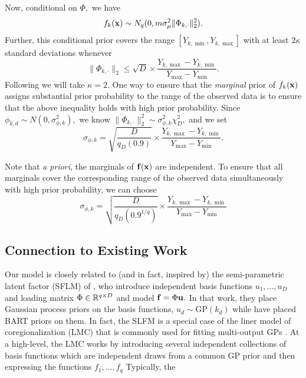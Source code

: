 \documentclass[12pt]{article}
\begin{document}
Now, conditional on $\Phi,$ we have 
$$
f_{k}(\mathbf{x}) \sim N_{q}(0, m\sigma^{2}_{\mu}\lVert \Phi_{k,\cdot}\rVert_{2}^{2}).
$$
Further, this conditional prior covers the range $[Y_{k,\min}, Y_{k,\max}]$ with at least $2\kappa$ standard deviations whenever
$$
\lVert \Phi_{k,\cdot} \rVert_{2} \leq \sqrt{D} \times \frac{Y_{k,\max} - Y_{k,\min}}{Y_{\max} - Y_{\min}}.
$$
Following \citet{Chipman2010} we will take $\kappa = 2.$
One way to ensure that the \textit{marginal} prior of $f_{k}(\mathbf{x})$ assigns substantial prior probability to the range of the observed data is to ensure that the above inequality holds with high prior probability.
Since $\phi_{k,d} \sim N(0,\sigma^{2}_{\phi,k}),$ we know $\lVert \Phi_{k,\cdot}\rVert_{2}^{2} \sim \sigma^{2}_{\phi,k}\chi^{2}_{D},$ and we set
$$
\sigma_{\phi,k} = \sqrt{\frac{D}{q_{D}(0.9)}} \times \frac{Y_{k,\max} - Y_{k,\min}}{Y_{\max} - Y_{\min}}.
$$

Note that \textit{a priori}, the marginals of $\mathbf{f}(\mathbf{x})$ are independent.
To ensure that all marginals cover the corresponding range of the observed data simultaneously with high prior probability, we can choose
$$
\sigma_{\phi,k} = \sqrt{\frac{D}{q_{D}(0.9^{1/q})}} \times \frac{Y_{k,\max} - Y_{k,\min}}{Y_{\max} - Y_{\min}}
$$
\subsection{Connection to Existing Work}
\label{sec:related_work}

Our model is closely related to (and in fact, inspired by) the semi-parametric latent factor (SFLM) of \citet{Teh2005}, who introduce independent basis functions $u_{1}, \ldots, u_{D}$ and loading matrix $\Phi \in \mathbb{R}^{q \times D}$ and model $\mathbf{f} = \Phi \mathbf{u}.$
In that work, they place Gaussian process priors on the basis functions, $u_{d} \sim \text{GP}(k_{d})$ while have placed BART priors on them. 
In fact, the SLFM is a special case of the liner model of coregionalization (LMC) that is commonly used for fitting multi-output GPs \citep[see, e.g.][]{Alvarez2012}.
At a high-level, the LMC works by introducing several independent collections of basis functions which are independent draws from a common GP prior and then expressing the functions $f_{1}, \ldots, f_{q}$ 
Typically, the 
\end{document}
